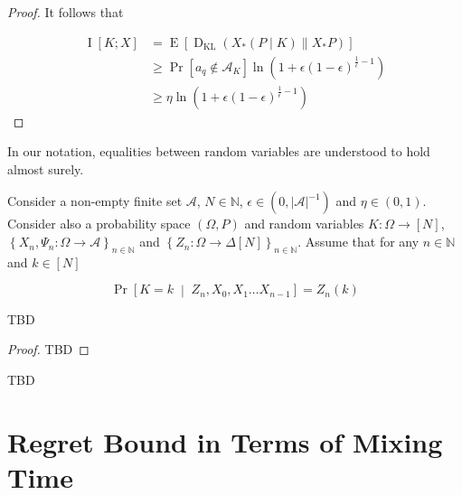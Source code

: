 \documentclass[anon,12pt]{colt2018} %
\newcommand{\AP}[1]{\left(#1\right)}
\newcommand{\AB}[1]{\left[#1\right]}
\newcommand{\AC}[1]{\left\{#1\right\}}
\newcommand{\ABM}[2]{\left[#1\;\middle\vert\;#2\right]}
\newcommand{\Pa}[2]{\underset{#1}{\operatorname{Pr}}\AB{#2}}
\newcommand{\CP}[3]{\underset{#1}{\operatorname{Pr}}\ABM{#2}{#3}}
\newcommand{\Ea}[2]{\underset{#1}{\operatorname{E}}\AB{#2}}
\newcommand{\Ia}[2]{\underset{#1}{\operatorname{I}}\AB{#2}}
\newcommand{\KL}[2]{\operatorname{D}_{\mathrm{KL}}(#1 \| #2)}
\newcommand{\Nats}{\mathbb{N}}
\newcommand{\Abs}[1]{\left\vert #1 \right\vert}
\newcommand{\A}{\mathcal{A}}
\begin{document}
\begin{proof}
It follows that

\begin{align*}
\Ia{}{K;X} &= \Ea{}{\KL{X_*(P \mid K)}{X_* P}} \\ 
&\geq \Pa{}{a_q \not \in \A_K} \ln{\AP{1+\epsilon(1-\epsilon)^{\frac{1}{\epsilon}-1}}} \\
&\geq \eta \ln{\AP{1+\epsilon(1-\epsilon)^{\frac{1}{\epsilon}-1}}}
\end{align*}
\end{proof}

In our notation, equalities between random variables are understood to hold almost surely.

\begin{samepage}
\begin{proposition}
\label{prp:delegation}

Consider  a non-empty finite set $\A$, $N \in \Nats$, $\epsilon\in\AP{0,\Abs{\A}^{-1}}$ and $\eta\in(0,1)$. Consider also  a probability space $(\Omega,P)$ and random variables $K: \Omega \rightarrow [N]$, $\AC{X_n,\Psi_n: \Omega \rightarrow \A}_{n \in \Nats}$ and $\AC{Z_n: \Omega \rightarrow \Delta[N]}_{n \in \Nats}$. Assume that for any $n\in\Nats$ and $k\in[N]$

\begin{equation}
\CP{}{K = k}{Z_n,X_0,X_1 \dots X_{n-1}}=Z_n(k)
\end{equation}


TBD

\end{proposition}
\end{samepage}

\begin{proof}

TBD
\end{proof}

TBD

\section{Regret Bound in Terms of Mixing Time}
\label{sec:mixing_time}
\end{document}
